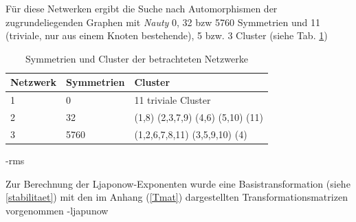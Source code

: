 Für diese Netwerken ergibt die Suche nach Automorphismen der zugrundeliegenden Graphen mit \textit{Nauty} 0, 32 bzw 5760 Symmetrien und 11 (triviale, nur aus einem Knoten bestehende), 5 bzw. 3 Cluster (siehe Tab. \ref{tab:netzwerke})

\begin{table}[]
	\begin{center}
	\caption{Symmetrien und Cluster der betrachteten Netzwerke}
	\label{tab:netzwerke}
\begin{tabular}{lll}
	Netzwerk & Symmetrien & Cluster                           \\
	\hline
	1        & 0          & 11 triviale Cluster               \\
	2        & 32         & (1,8) (2,3,7,9) (4,6) (5,10) (11) \\
	3        & 5760       & (1,2,6,7,8,11) (3,5,9,10) (4) \\  
	\hline
\end{tabular}
	\end{center}
\end{table}


-rms

Zur Berechnung der Ljaponow-Exponenten wurde eine Basistransformation (siehe \ref{stabilitaet}) mit den im Anhang (\ref{Tmat}) dargestellten Transformationsmatrizen vorgenommen \cite{pecora2014,sagenotebook}
-ljapunow

